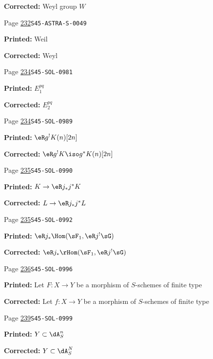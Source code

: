 \begin{description}
\par\noindent\textbf{Corrected:} Weyl group $W$
\smallskip
\item[\hypertarget{apparatus:EN-0168}{168}] Page \hyperlink{printpage:en:232}{232}\quad\texttt{S45-ASTRA-S-0049}
\par\noindent\textbf{Printed:} Weil
\par\noindent\textbf{Corrected:} Weyl
\smallskip
\item[\hypertarget{apparatus:EN-0169}{169}] Page \hyperlink{printpage:en:234}{234}\quad\texttt{S45-SOL-0981}
\par\noindent\textbf{Printed:} \(E_1^{p q}\)
\par\noindent\textbf{Corrected:} \(E_2^{p q}\)
\smallskip
\item[\hypertarget{apparatus:EN-0170}{170}] Page \hyperlink{printpage:en:234}{234}\quad\texttt{S45-SOL-0989}
\par\noindent\textbf{Printed:} \(\eR g^! K(n)[2 n]\)
\par\noindent\textbf{Corrected:} \(\eR g^! K \iso g^\ast K(n)[2 n]\)
\smallskip
\item[\hypertarget{apparatus:EN-0171}{171}] Page \hyperlink{printpage:en:235}{235}\quad\texttt{S45-SOL-0990}
\par\noindent\textbf{Printed:} \(K\to \eR j_\ast j^\ast K\)
\par\noindent\textbf{Corrected:} \(L\to \eR j_\ast j^\ast L\)
\smallskip
\item[\hypertarget{apparatus:EN-0172}{172}] Page \hyperlink{printpage:en:235}{235}\quad\texttt{S45-SOL-0992}
\par\noindent\textbf{Printed:} \(\eR j_\ast \Hom(\sF_1,\eR j^! \sG)\)
\par\noindent\textbf{Corrected:} \(\eR j_\ast \rHom(\sF_1,\eR j^! \sG)\)
\smallskip
\item[\hypertarget{apparatus:EN-0173}{173}] Page \hyperlink{printpage:en:236}{236}\quad\texttt{S45-SOL-0996}
\par\noindent\textbf{Printed:} Let $F:X\to Y$ be a morphism of $S$-schemes of finite type
\par\noindent\textbf{Corrected:} Let $f:X\to Y$ be a morphism of $S$-schemes of finite type
\smallskip
\item[\hypertarget{apparatus:EN-0174}{174}] Page \hyperlink{printpage:en:239}{239}\quad\texttt{S45-SOL-0999}
\par\noindent\textbf{Printed:} \(Y\subset \dA_S^n\)
\par\noindent\textbf{Corrected:} \(Y\subset \dA_S^N\)

\end{description}
